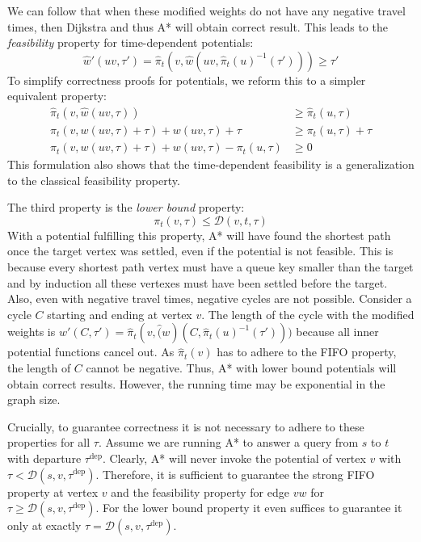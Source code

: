 \documentclass[a4paper,UKenglish,cleveref, autoref, thm-restate,anonymous]{lipics-v2021}
\newcommand*{\dist}{\mathcal{D}}
\newcommand*{\tdep}{\tau^{\operatorname{dep}}}
\begin{document}
We can follow that when these modified weights do not have any negative travel times, then Dijkstra and thus A* will obtain correct result. %
This leads to the \emph{feasibility} property for time-dependent potentials:
\[
\hat{w}'(uv, \tau') = \hat{\pi}_t(v, \hat{w}(uv, \hat{\pi}_t(u)^{-1}(\tau'))) \geq \tau'
\]
To simplify correctness proofs for potentials, we reform this to a simpler equivalent property:
\begin{align*}
\hat{\pi}_t(v, \hat{w}(uv, \tau)) & \geq \hat{\pi}_t(u, \tau) \\
\pi_t(v, w(uv, \tau) + \tau) + w(uv, \tau) + \tau & \geq \pi_t(u, \tau) + \tau \\
\pi_t(v, w(uv, \tau) + \tau) + w(uv, \tau) - \pi_t(u, \tau) & \geq 0
\end{align*}
This formulation also shows that the time-dependent feasibility is a generalization to the classical feasibility property.

The third property is the \emph{lower bound} property:
\[
\pi_t(v, \tau) \leq \dist(v,t,\tau)
\]
With a potential fulfilling this property, A* will have found the shortest path once the target vertex was settled, even if the potential is not feasible.
This is because every shortest path vertex must have a queue key smaller than the target and by induction all these vertexes must have been settled before the target.
Also, even with negative travel times, negative cycles are not possible.
Consider a cycle $C$ starting and ending at vertex $v$.
The length of the cycle with the modified weights is $w'(C, \tau') = \hat{\pi}_t(v, \hat(w)(C, \hat{\pi}_t(u)^{-1}(\tau')))$ because all inner potential functions cancel out.
As $\hat{\pi}_t(v)$ has to adhere to the FIFO property, the length of $C$ cannot be negative.
Thus, A* with lower bound potentials will obtain correct results.
However, the running time may be exponential in the graph size.

Crucially, to guarantee correctness it is not necessary to adhere to these properties for all $\tau$.
Assume we are running A* to answer a query from $s$ to $t$ with departure $\tdep$.
Clearly, A* will never invoke the potential of vertex $v$ with $\tau < \dist(s,v,\tdep)$.
Therefore, it is sufficient to guarantee the strong FIFO property at vertex $v$ and the feasibility property for edge $vw$ for $\tau \geq \dist(s,v,\tdep)$.
For the lower bound property it even suffices to guarantee it only at exactly $\tau = \dist(s,v,\tdep)$.

\end{document}
